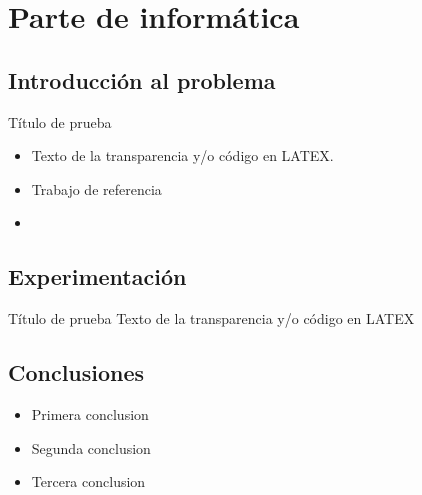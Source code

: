 \section{Parte de informática}

\subsection{Introducción al problema}
\begin{frame}{Título de prueba}
	\begin{itemize}
		\item Texto de la transparencia y/o código en LATEX.
		\item Trabajo de referencia \cite{matematicas:principal}
		\item
	\end{itemize}
\end{frame}

\subsection{Experimentación}
\begin{frame}{Título de prueba}
	Texto de la transparencia y/o código en LATEX
\end{frame}

\subsection{Conclusiones}
\begin{frame}
	\begin{itemize}
		\item Primera conclusion
		\item Segunda conclusion
		\item Tercera conclusion
	\end{itemize}
\end{frame}
